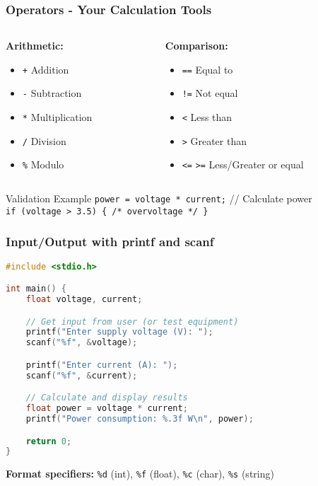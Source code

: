 \documentclass{beamer}
\begin{document}
\begin{frame}
\frametitle{Operators - Your Calculation Tools}
\begin{columns}
\begin{column}{0.5\textwidth}
\textbf{Arithmetic:}
\begin{itemize}
    \item \texttt{+} Addition
    \item \texttt{-} Subtraction
    \item \texttt{*} Multiplication
    \item \texttt{/} Division
    \item \texttt{\%} Modulo
\end{itemize}
\end{column}
\begin{column}{0.5\textwidth}
\textbf{Comparison:}
\begin{itemize}
    \item \texttt{==} Equal to
    \item \texttt{!=} Not equal
    \item \texttt{<} Less than
    \item \texttt{>} Greater than
    \item \texttt{<=} \texttt{>=} Less/Greater or equal
\end{itemize}
\end{column}
\end{columns}

\vspace{0.5cm}
\begin{exampleblock}{Validation Example}
\texttt{power = voltage * current;} // Calculate power\\
\texttt{if (voltage > 3.5) \{ /* overvoltage */ \}}
\end{exampleblock}
\end{frame}

\begin{frame}[fragile]
\frametitle{Input/Output with printf and scanf}
\begin{lstlisting}[language=C, basicstyle=\ttfamily\tiny]
#include <stdio.h>

int main() {
    float voltage, current;

    // Get input from user (or test equipment)
    printf("Enter supply voltage (V): ");
    scanf("%f", &voltage);

    printf("Enter current (A): ");
    scanf("%f", &current);

    // Calculate and display results
    float power = voltage * current;
    printf("Power consumption: %.3f W\n", power);

    return 0;
}
\end{lstlisting}

\textbf{Format specifiers:} \texttt{\%d} (int), \texttt{\%f} (float), \texttt{\%c} (char), \texttt{\%s} (string)
\end{frame}
\end{document}
